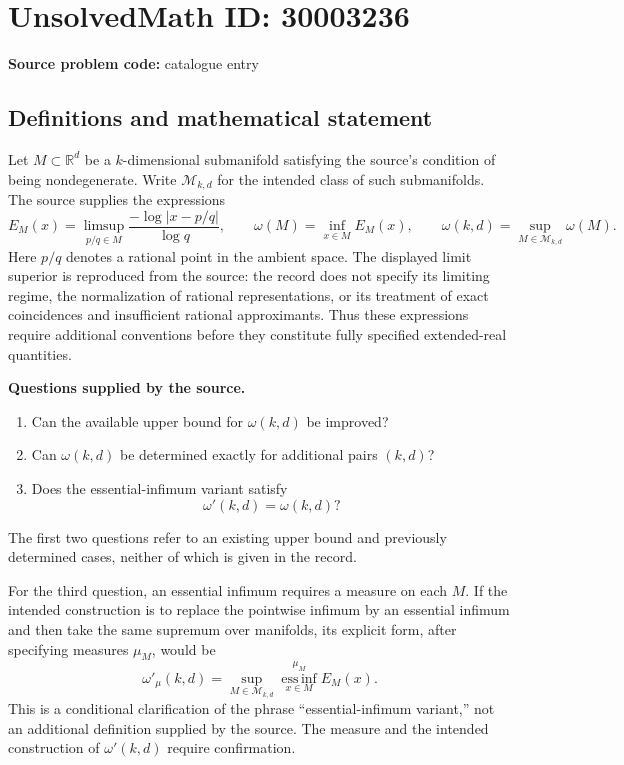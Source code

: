 \documentclass[11pt]{article}
\newcommand{\R}{\mathbb{R}}
\begin{document}
\section*{UnsolvedMath ID: 30003236}
\textbf{Source problem code:} catalogue entry
\subsection{Definitions and mathematical statement}
Let \(M\subset\R^d\) be a \(k\)-dimensional submanifold satisfying the source's condition of being nondegenerate. Write \(\mathcal M_{k,d}\) for the intended class of such submanifolds. The source supplies the expressions
\[
E_M(x)=\limsup_{p/q\in M}\frac{-\log|x-p/q|}{\log q},
\qquad
\omega(M)=\inf_{x\in M}E_M(x),
\qquad
\omega(k,d)=\sup_{M\in\mathcal M_{k,d}}\omega(M).
\]
Here \(p/q\) denotes a rational point in the ambient space. The displayed limit superior is reproduced from the source: the record does not specify its limiting regime, the normalization of rational representations, or its treatment of exact coincidences and insufficient rational approximants. Thus these expressions require additional conventions before they constitute fully specified extended-real quantities.

\textbf{Questions supplied by the source.}
\begin{enumerate}
\item Can the available upper bound for \(\omega(k,d)\) be improved?
\item Can \(\omega(k,d)\) be determined exactly for additional pairs \((k,d)\)?
\item Does the essential-infimum variant satisfy
\[
\omega'(k,d)=\omega(k,d)?
\]
\end{enumerate}
The first two questions refer to an existing upper bound and previously determined cases, neither of which is given in the record.

For the third question, an essential infimum requires a measure on each \(M\). If the intended construction is to replace the pointwise infimum by an essential infimum and then take the same supremum over manifolds, its explicit form, after specifying measures \(\mu_M\), would be
\[
\omega'_{\mu}(k,d)
=\sup_{M\in\mathcal M_{k,d}}
\operatorname*{ess\,inf}_{x\in M}^{\mu_M}E_M(x).
\]
This is a conditional clarification of the phrase ``essential-infimum variant,'' not an additional definition supplied by the source. The measure and the intended construction of \(\omega'(k,d)\) require confirmation.
\end{document}
